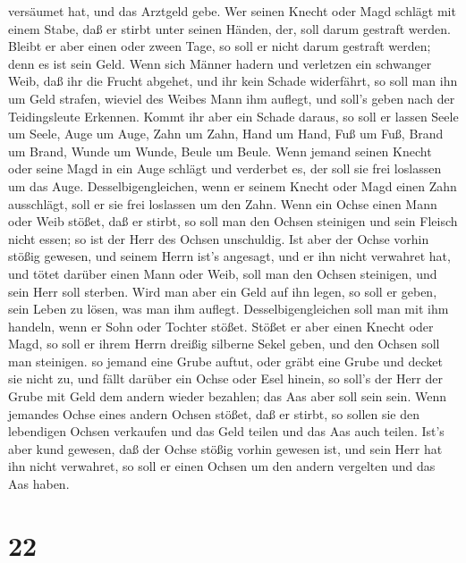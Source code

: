 versäumet hat, und das Arztgeld gebe.  Wer seinen Knecht
oder Magd schlägt mit einem Stabe, daß er stirbt unter seinen Händen,
der, soll darum gestraft werden.  Bleibt er aber einen oder
zween Tage, so soll er nicht darum gestraft werden; denn es ist sein
Geld.  Wenn sich Männer hadern und verletzen ein schwanger
Weib, daß ihr die Frucht abgehet, und ihr kein Schade widerfährt, so
soll man ihn um Geld strafen, wieviel des Weibes Mann ihm auflegt, und
soll's geben nach der Teidingsleute Erkennen.  Kommt ihr
aber ein Schade daraus, so soll er lassen Seele um Seele, 
Auge um Auge, Zahn um Zahn, Hand um Hand, Fuß um Fuß, 
Brand um Brand, Wunde um Wunde, Beule um Beule.  Wenn
jemand seinen Knecht oder seine Magd in ein Auge schlägt und verderbet
es, der soll sie frei loslassen um das Auge. 
Desselbigengleichen, wenn er seinem Knecht oder Magd einen Zahn
ausschlägt, soll er sie frei loslassen um den Zahn.  Wenn
ein Ochse einen Mann oder Weib stößet, daß er stirbt, so soll man den
Ochsen steinigen und sein Fleisch nicht essen; so ist der Herr des
Ochsen unschuldig.  Ist aber der Ochse vorhin stößig
gewesen, und seinem Herrn ist's angesagt, und er ihn nicht verwahret
hat, und tötet darüber einen Mann oder Weib, soll man den Ochsen
steinigen, und sein Herr soll sterben.  Wird man aber ein
Geld auf ihn legen, so soll er geben, sein Leben zu lösen, was man ihm
auflegt.  Desselbigengleichen soll man mit ihm handeln,
wenn er Sohn oder Tochter stößet.  Stößet er aber einen
Knecht oder Magd, so soll er ihrem Herrn dreißig silberne Sekel geben,
und den Ochsen soll man steinigen.  so jemand eine Grube
auftut, oder gräbt eine Grube und decket sie nicht zu, und fällt darüber
ein Ochse oder Esel hinein,  so soll's der Herr der Grube
mit Geld dem andern wieder bezahlen; das Aas aber soll sein sein.
 Wenn jemandes Ochse eines andern Ochsen stößet, daß er
stirbt, so sollen sie den lebendigen Ochsen verkaufen und das Geld
teilen und das Aas auch teilen.  Ist's aber kund gewesen,
daß der Ochse stößig vorhin gewesen ist, und sein Herr hat ihn nicht
verwahret, so soll er einen Ochsen um den andern vergelten und das Aas
haben.

\hypertarget{section-21}{%
\section{22}\label{section-21}}

